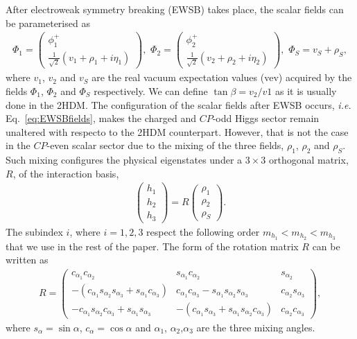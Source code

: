 \documentclass[12pt]{article}
\begin{document}
After electroweak symmetry breaking (EWSB) takes place, the scalar fields can be parameterised as
\begin{align}
\Phi_1=\left(
\begin{array}{c}
\phi_1^+\\
\frac{1}{\sqrt{2}}(v_1+\rho_1+i\eta_1)
\end{array}
\right),\,\,
\Phi_2=\left(
\begin{array}{c}
\phi_2^+\\
\frac{1}{\sqrt{2}}(v_2+\rho_2+i\eta_2)
\end{array}
\right),\,\,
\Phi_S=v_S+\rho_S,
\label{eq:EWSBfields}
\end{align}
where $v_1$, $v_2$ and $v_S$ are the real vacuum expectation values (vev) acquired by the fields $\Phi_1$, $\Phi_2$ and $\Phi_S$ respectively. We can define $\tan \beta=v_2/v1$ as it is usually done in the 2HDM. The configuration of the scalar fields after EWSB occurs, \textit{i.e.} Eq.~\eqref{eq:EWSBfields}, makes the charged and $CP$-odd Higgs sector remain unaltered with respecto to the 2HDM counterpart. However, that is not the case in the $CP$-even scalar sector due to the mixing of the three fields, $\rho_1$, $\rho_2$ and $\rho_S$. Such mixing configures the physical eigenstates under a $3\times 3$ orthogonal matrix, $R$, of the interaction basis, 
\begin{align}
\left(
\begin{array}{c}
h_1\\
h_2\\
h_3
\end{array}
\right)=R\left(
\begin{array}{c}
\rho_1\\
\rho_2\\
\rho_S
\end{array}
\right).
\end{align}
The subindex $i$, where $i=1,2,3$ respect the following order $m_{h_1}<m_{h_2}<m_{h_3}$ that we use in the rest of the paper. The form of the rotation matrix $R$ can be written as
\begin{align}
R=\left(
\begin{array}{ccc}
c_{\alpha_1}c_{\alpha_2}&s_{\alpha_1}c_{\alpha_2}&s_{\alpha_2}\\
-(c_{\alpha_1}s_{\alpha_2}s_{\alpha_3}+s_{\alpha_1}c_{\alpha_3})&c_{\alpha_1}c_{\alpha_3}-s_{\alpha_1}s_{\alpha_2}s_{\alpha_3}&c_{\alpha_2}s_{\alpha_3}\\
-c_{\alpha_1}s_{\alpha_2}c_{\alpha_3}+s_{\alpha_1}s_{\alpha_3}&-(c_{\alpha_1}s_{\alpha_3}+s_{\alpha_1}s_{\alpha_2}c_{\alpha_3})& c_{\alpha_2}c_{\alpha_3}
\end{array}
\right),
\label{eq:rotationm}
\end{align}
where $s_\alpha=\sin\alpha$, $c_\alpha=\cos\alpha$ and $\alpha_1$, $\alpha_2$,$\alpha_3$ are the three mixing angles.
\end{document}
